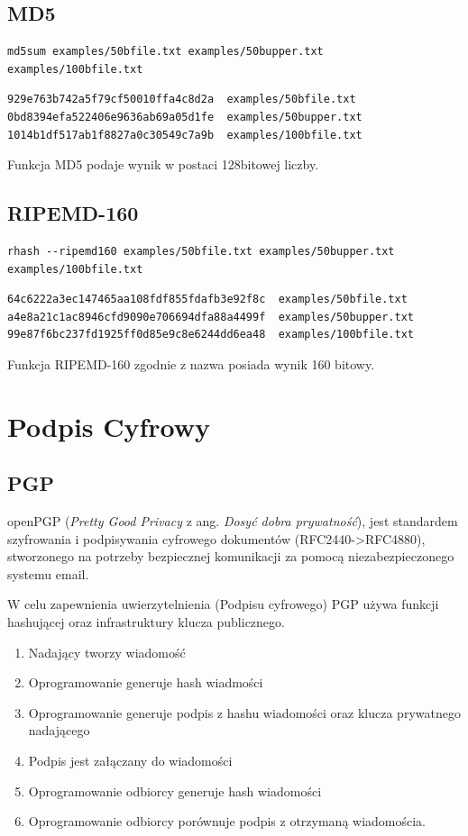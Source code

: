 \documentclass[11pt]{article}
\begin{document}
\subsection{MD5}
\label{sec:orge4f6ec9}
\begin{verbatim}
md5sum examples/50bfile.txt examples/50bupper.txt examples/100bfile.txt
\end{verbatim}

\begin{verbatim}
929e763b742a5f79cf50010ffa4c8d2a  examples/50bfile.txt
0bd8394efa522406e9636ab69a05d1fe  examples/50bupper.txt
1014b1df517ab1f8827a0c30549c7a9b  examples/100bfile.txt
\end{verbatim}


Funkcja MD5 podaje wynik w postaci 128bitowej liczby.
\subsection{RIPEMD-160}
\label{sec:org43fae25}
\begin{verbatim}
rhash --ripemd160 examples/50bfile.txt examples/50bupper.txt  examples/100bfile.txt
\end{verbatim}

\begin{verbatim}
64c6222a3ec147465aa108fdf855fdafb3e92f8c  examples/50bfile.txt
a4e8a21c1ac8946cfd9090e706694dfa88a4499f  examples/50bupper.txt
99e87f6bc237fd1925ff0d85e9c8e6244dd6ea48  examples/100bfile.txt
\end{verbatim}


Funkcja RIPEMD-160 zgodnie z nazwa posiada wynik 160 bitowy.
\section{Podpis Cyfrowy}
\label{sec:org10348b2}
\subsection{PGP}
\label{sec:org831d7e7}
openPGP (\emph{Pretty Good Privacy} z ang. \emph{Dosyć dobra prywatność}), jest standardem szyfrowania i podpisywania cyfrowego dokumentów (RFC2440->RFC4880), stworzonego na potrzeby bezpiecznej komunikacji za pomocą niezabezpieczonego systemu email.

W celu zapewnienia uwierzytelnienia (Podpisu cyfrowego) PGP używa funkcji hashującej oraz infrastruktury klucza publicznego.

\begin{enumerate}
\item Nadający tworzy wiadomość
\item Oprogramowanie generuje hash wiadmości
\item Oprogramowanie generuje podpis z hashu wiadomości oraz klucza prywatnego nadającego
\item Podpis jest załączany do wiadomości
\item Oprogramowanie odbiorcy generuje hash wiadomości
\item Oprogramowanie odbiorcy porównuje podpis z otrzymaną wiadomościa.
\end{enumerate}
\end{document}
